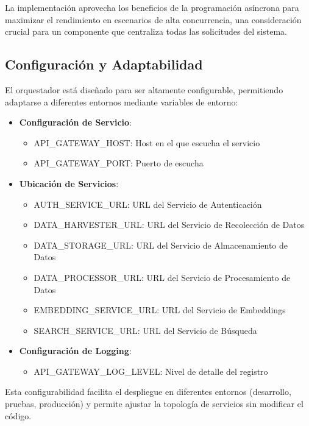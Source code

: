 \documentclass[12pt,a4paper]{article}
\begin{document}
La implementación aprovecha los beneficios de la programación asíncrona para maximizar el rendimiento en escenarios de alta concurrencia, una consideración crucial para un componente que centraliza todas las solicitudes del sistema.

\subsection{Configuración y Adaptabilidad}
\label{subsec:os-configuracion}

El orquestador está diseñado para ser altamente configurable, permitiendo adaptarse a diferentes entornos mediante variables de entorno:

\begin{itemize}
    \item \textbf{Configuración de Servicio}:
    \begin{itemize}
        \item API\_GATEWAY\_HOST: Host en el que escucha el servicio
        \item API\_GATEWAY\_PORT: Puerto de escucha
    \end{itemize}
    
    \item \textbf{Ubicación de Servicios}:
    \begin{itemize}
        \item AUTH\_SERVICE\_URL: URL del Servicio de Autenticación
        \item DATA\_HARVESTER\_URL: URL del Servicio de Recolección de Datos
        \item DATA\_STORAGE\_URL: URL del Servicio de Almacenamiento de Datos
        \item DATA\_PROCESSOR\_URL: URL del Servicio de Procesamiento de Datos
        \item EMBEDDING\_SERVICE\_URL: URL del Servicio de Embeddings
        \item SEARCH\_SERVICE\_URL: URL del Servicio de Búsqueda
    \end{itemize}
    
    \item \textbf{Configuración de Logging}:
    \begin{itemize}
        \item API\_GATEWAY\_LOG\_LEVEL: Nivel de detalle del registro
    \end{itemize}
\end{itemize}

Esta configurabilidad facilita el despliegue en diferentes entornos (desarrollo, pruebas, producción) y permite ajustar la topología de servicios sin modificar el código.
\end{document}
